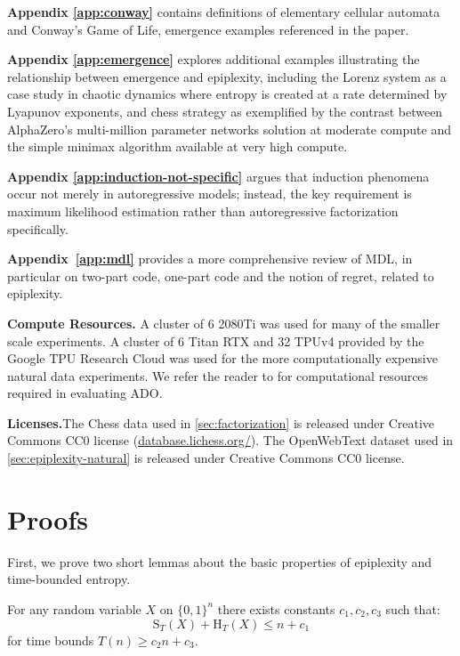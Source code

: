 \documentclass[twoside]{article}
\newcommand{\rH}{\mathrm{H}}
\newcommand{\rS}{\mathrm{S}}
\begin{document}
\textbf{Appendix \ref{app:conway}} contains definitions of elementary cellular automata and Conway's Game of Life, emergence examples referenced in the paper.

\textbf{Appendix \ref{app:emergence}} explores additional examples illustrating the relationship between emergence and epiplexity, including the Lorenz system as a case study in chaotic dynamics where entropy is created at a rate determined by Lyapunov exponents, and chess strategy as exemplified by the contrast between AlphaZero's multi-million parameter networks solution at moderate compute and the simple minimax algorithm available at very high compute.

\textbf{Appendix \ref{app:induction-not-specific}} argues that induction phenomena occur not merely in autoregressive models; instead, the key requirement is maximum likelihood estimation rather than autoregressive factorization specifically.

\textbf{Appendix~\ref{app:mdl}} provides a more comprehensive review of MDL, in particular on two-part code, one-part code and the notion of regret, related to epiplexity. %


\textbf{Compute Resources.}\quad 
A cluster of 6 2080Ti was used for many of the smaller scale experiments. A cluster of 6 Titan RTX and 32 TPUv4 provided by the Google TPU Research Cloud was used for the more computationally expensive natural data experiments. We refer the reader to \citet{jiang2025adaptive} for computational resources required in evaluating ADO.
%

\textbf{Licenses.}\quad The Chess data used in \cref{sec:factorization} is released under Creative Commons CC0 license (\href{https://database.lichess.org/}{\url{database.lichess.org/}}).
The OpenWebText dataset used in \cref{sec:epiplexity-natural} is released under Creative Commons CC0 license.


\section{Proofs}\label{app:proofs}


First, we prove two short lemmas about the basic properties of epiplexity and time-bounded entropy.



\begin{lemma}
\label{lemma:maxdl}
    For any random variable $X$ on $\{0,1\}^n$ there exists constants $c_1,c_2,c_3$ such that:
    \begin{equation}
        \rS_T(X) + \rH_T(X) \leq n + c_1
    \end{equation}
    for time bounds $T(n) \ge c_2n+c_3$.
\end{lemma}
\end{document}
